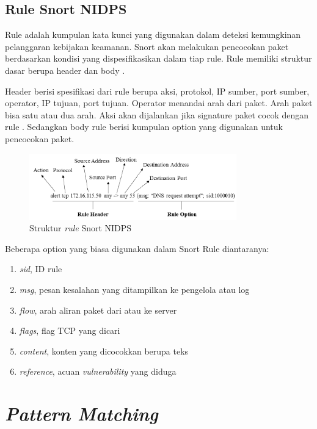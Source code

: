   \subsection{Rule Snort NIDPS}

    Rule adalah kumpulan kata kunci yang digunakan dalam deteksi kemungkinan pelanggaran kebijakan keamanan. Snort akan melakukan pencocokan paket berdasarkan kondisi yang dispesifikasikan dalam tiap rule. Rule memiliki struktur dasar berupa header dan body \parencite{snort}. 

    Header berisi spesifikasi dari  rule berupa aksi, protokol, IP sumber, port sumber, operator, IP tujuan, port tujuan. Operator menandai arah dari paket. Arah paket bisa satu atau dua arah. Aksi akan dijalankan jika signature paket cocok dengan rule \parencite{5358130}. Sedangkan body rule berisi kumpulan option yang digunakan untuk pencocokan paket. 

    \begin{figure}[H]
      \centering
      \includegraphics[width=0.8\textwidth]{resources/rule.png}
      \caption{Struktur \emph{rule} Snort NIDPS \parencite{khamphakdee2014}}
    \end{figure}

    Beberapa option yang biasa digunakan dalam Snort Rule diantaranya:

    \begin{enumerate} 
      \item \emph{sid}, ID rule
      \item \emph{msg}, pesan kesalahan yang ditampilkan ke pengelola atau log
      \item \emph{flow}, arah aliran paket dari atau ke server
      \item \emph{flags}, flag TCP yang dicari
      \item \emph{content}, konten yang dicocokkan berupa teks
      \item \emph{reference}, acuan \emph{vulnerability} yang diduga
    \end{enumerate} 

\section{\emph{Pattern Matching}}


